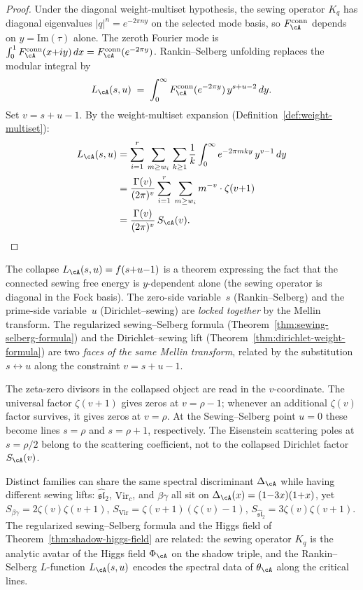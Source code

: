 \begin{proof}
Under the diagonal weight-multiset hypothesis, the sewing operator
$K_q$ has diagonal eigenvalues $|q|^n=e^{-2\pi ny}$ on the selected
mode basis, so $F_\cA^{\mathrm{conn}}$ depends on
$y=\mathrm{Im}(\tau)$ alone. The zeroth Fourier mode is
$\int_0^1 F_\cA^{\mathrm{conn}}(x{+}iy)\,dx
= F_\cA^{\mathrm{conn}}(e^{-2\pi y})$.
Rankin--Selberg unfolding replaces the modular integral by
\[
L_\cA(s,u)
\;=\;
\int_0^\infty
F_\cA^{\mathrm{conn}}(e^{-2\pi y})\,y^{s+u-2}\,dy.
\]
Set $v = s + u - 1$.
By the weight-multiset expansion
(Definition~\ref{def:weight-multiset}):
\begin{align*}
L_\cA(s,u)
&= \sum_{i=1}^r\,\sum_{m \ge w_i}\,\sum_{k \ge 1}
\frac{1}{k}\int_0^\infty e^{-2\pi mky}\,y^{v-1}\,dy
\\
&= \frac{\Gamma(v)}{(2\pi)^v}
\sum_{i=1}^r\,\sum_{m \ge w_i} m^{-v}\cdot\zeta(v{+}1)
\\
&= \frac{\Gamma(v)}{(2\pi)^v}\,S_\cA(v).
\qedhere
\end{align*}
\end{proof}

\begin{remark}%
\label{rem:sewing-hecke-collapse}%
%
The collapse $L_\cA(s,u) = f(s{+}u{-}1)$ is a theorem
expressing the fact that the connected sewing free energy
is $y$-dependent alone (the sewing operator is diagonal
in the Fock basis). The zero-side variable~$s$
(Rankin--Selberg) and the prime-side variable~$u$
(Dirichlet--sewing) are \emph{locked together} by the
Mellin transform.
The regularized sewing--Selberg formula
(Theorem~\ref{thm:sewing-selberg-formula}) and the
Dirichlet--sewing lift
(Theorem~\ref{thm:dirichlet-weight-formula}) are two
\emph{faces of the same Mellin transform}, related by
the substitution $s \leftrightarrow u$ along the
constraint $v = s + u - 1$.

The zeta-zero divisors in the collapsed object are read in the
$v$-coordinate. The universal factor $\zeta(v{+}1)$ gives zeros at
$v=\rho-1$; whenever an additional $\zeta(v)$ factor survives, it gives
zeros at $v=\rho$. At the Sewing--Selberg point $u=0$ these become
lines $s=\rho$ and $s=\rho+1$, respectively. The Eisenstein scattering
poles at $s=\rho/2$ belong to the scattering coefficient, not to the
collapsed Dirichlet factor $S_\cA(v)$.

Distinct families can share the same spectral
discriminant $\Delta_\cA$ while having different sewing
lifts: $\widehat{\mathfrak{sl}}_2$, $\mathrm{Vir}_c$,
and $\beta\gamma$ all sit on $\Delta_\cA(x) = (1{-}3x)(1{+}x)$,
yet $S_{\beta\gamma} = 2\zeta(v)\zeta(v{+}1)$,
$S_{\mathrm{Vir}} = \zeta(v{+}1)(\zeta(v){-}1)$,
$S_{\widehat{\mathfrak{sl}}_2} = 3\zeta(v)\zeta(v{+}1)$.
The regularized sewing--Selberg formula and the Higgs field of
Theorem~\ref{thm:shadow-higgs-field}
are related: the sewing operator $K_q$ is the analytic avatar of the
Higgs field $\Phi_\cA$ on the shadow triple, and the
Rankin--Selberg $L$-function $L_\cA(s,u)$ encodes the spectral data
of $\theta_\cA$ along the critical lines.
\end{remark}

